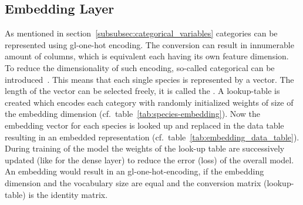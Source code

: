 %
%


%


\subsection{Embedding Layer}
\label{subsec:embedding-layer}

As mentioned in section~\ref{subsubsec:categorical_variables} categories can be represented using \gls{gl-one-hot} encoding.
The conversion can result in innumerable amount of columns, which is equivalent each having its own feature dimension.
To reduce the dimensionality of such encoding, so-called categorical  can be introduced~\cite{brownlee2021}.
This means that each single species is represented by a vector.
The length of the vector can be selected freely, it is called the .
A lookup-table is created which encodes each category with randomly initialized weights of size of the embedding dimension (cf.\ table~\ref{tab:species-embedding}).
Now the embedding vector for each species is looked up and replaced in the data table resulting in an embedded representation (cf.\ table~\ref{tab:embedding_data_table}).
During training of the model the weights of the look-up table are successively updated (like for the dense layer) to reduce the error (loss) of the overall model.
An embedding would result in an \gls{gl-one-hot}-encoding, if the embedding dimension and the vocabulary size are equal and the conversion matrix (lookup-table) is the identity matrix.

